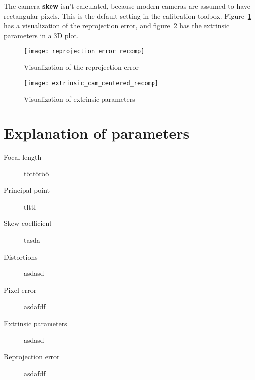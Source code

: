 The camera \textbf{skew} isn't calculated, because modern cameras are assumed
to have rectangular pixels. This is the default setting in the calibration
toolbox. Figure~\ref{fig:reprojection} has a visualization of the reprojection
error, and figure~\ref{fig:extrinsic} has the extrinsic parameters in a 3D plot.


\begin{figure}[h]
  \centering
  \texttt{[image: reprojection\_error\_recomp]}
  \caption{Visualization of the reprojection error}\label{fig:reprojection}
\end{figure}


\begin{figure}[h]
  \centering
  \texttt{[image: extrinsic\_cam\_centered\_recomp]}
  \caption{Visualization of extrinsic parameters}\label{fig:extrinsic}
\end{figure}

\section{Explanation of parameters}

\begin{description}

  \item[Focal length]           töttöröö

  \item[Principal point]        tlttl

  \item[Skew coefficient]       tasda

  \item[Distortions]            asdasd

  \item[Pixel error]            asdafdf

  \item[Extrinsic parameters]   asdasd

  \item[Reprojection error]     asdafdf

\end{description}
